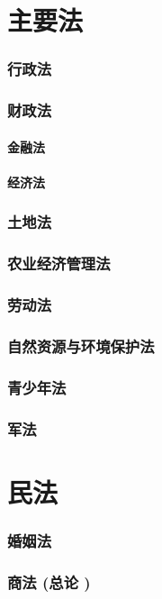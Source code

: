 \documentclass[UTF8]{../ApplicationUniverse}
\begin{document}
\section{主要法}
        \subsubsection{行政法}
        \subsubsection{财政法}
            \paragraph{金融法}
            \paragraph{经济法}
        \subsubsection{土地法}
        \subsubsection{农业经济管理法}
        \subsubsection{劳动法}
        \subsubsection{自然资源与环境保护法}
        \subsubsection{青少年法}
        \subsubsection{军法}

\section{民法}
        \subsubsection{婚姻法}
        \subsubsection{商法 (总论 )}
\end{document}

